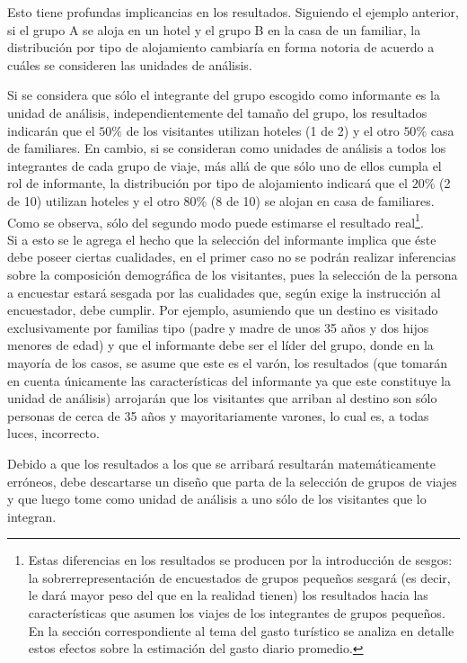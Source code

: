 \documentclass[
]{book}
\begin{document}
Esto tiene profundas implicancias en los resultados. Siguiendo el ejemplo anterior, si el grupo A se aloja en un hotel y el grupo B en la casa de un familiar, la distribución por tipo de alojamiento cambiaría en forma notoria de acuerdo a cuáles se consideren las unidades de análisis.

Si se considera que sólo el integrante del grupo escogido como informante es la unidad de análisis, independientemente del tamaño del grupo, los resultados indicarán que el \(50\%\) de los visitantes utilizan hoteles (1 de 2) y el otro \(50\%\) casa de familiares. En cambio, si se consideran como unidades de análisis a todos los integrantes de cada grupo de viaje, más allá de que sólo uno de ellos cumpla el rol de informante, la distribución por tipo de alojamiento indicará que el \(20\%\) (2 de 10) utilizan hoteles y el otro \(80\%\) (8 de 10) se alojan en casa de familiares. Como se observa, sólo del segundo modo puede estimarse el resultado real\footnote{Estas diferencias en los resultados se producen por la introducción de sesgos: la sobrerrepresentación de encuestados de grupos pequeños sesgará (es decir, le dará mayor peso del que en la realidad tienen) los resultados hacia las características que asumen los viajes de los integrantes de grupos pequeños. En la sección correspondiente al tema del gasto turístico se analiza en detalle estos efectos sobre la estimación del gasto diario promedio.}.\\

Si a esto se le agrega el hecho que la selección del informante implica que éste debe poseer ciertas cualidades, en el primer caso no se podrán realizar inferencias sobre la composición demográfica de los visitantes, pues la selección de la persona a encuestar estará sesgada por las cualidades que, según exige la instrucción al encuestador, debe cumplir. Por ejemplo, asumiendo que un destino es visitado exclusivamente por familias tipo (padre y madre de unos 35 años y dos hijos menores de edad) y que el informante debe ser el líder del grupo, donde en la mayoría de los casos, se asume que este es el varón, los resultados (que tomarán en cuenta únicamente las características del informante ya que este constituye la unidad de análisis) arrojarán que los visitantes que arriban al destino son sólo personas de cerca de 35 años y mayoritariamente varones, lo cual es, a todas luces, incorrecto.

Debido a que los resultados a los que se arribará resultarán matemáticamente erróneos, debe descartarse un diseño que parta de la selección de grupos de viajes y que luego tome como unidad de análisis a uno sólo de los visitantes que lo integran.
\end{document}
